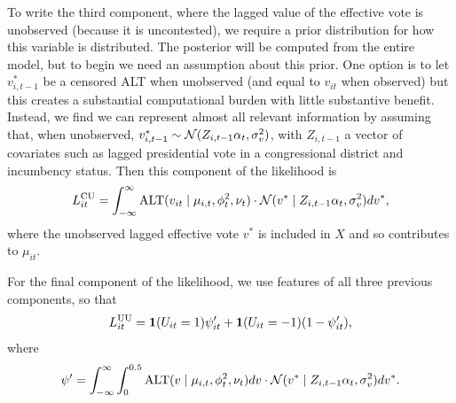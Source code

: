 \documentclass[12pt]{article}
\theoremstyle{definition}
\begin{document}
\begin{appendices}
To write the third component, where the lagged value of the effective vote is unobserved (because it is uncontested), we require a prior distribution for how this variable is distributed.  The posterior will be computed from the entire model, but to begin we need an assumption about this prior.  One option is to let $v_{i,t-1}^*$ be a censored ALT when unobserved (and equal to $v_{it}$ when observed) but this creates a substantial computational burden with little substantive benefit. Instead, we find we can represent almost all relevant information by assuming that, when unobserved, $v_{i,t-1}^*\sim{\cal N}(Z_{i,t-1}\alpha_t,\sigma_v^2)$, with $Z_{i,t-1}$ a vector of covariates such as lagged presidential vote in a congressional district and incumbency status.  Then this component of the likelihood is
\begin{equation}\label{CU}
  L_{it}^{\text{CU}} = \int_{-\infty}^\infty \text{ALT}(v_{it}\mid\mu_{i,t},\phi_t^2,\nu_t)
  \cdot {\cal N}(v^*\mid Z_{i,t-1}\alpha_t,\sigma_v^2) dv^*,
\end{equation}
where the unobserved lagged effective vote $v^*$ is included in $X$ and so contributes to $\mu_{it}$.

For the final component of the likelihood, we use features of all three previous components, so that
\begin{equation}\label{UU}
  L_{it}^{\text{UU}} = {\bf 1}(U_{it}=1)\psi^\prime_{it} + {\bf 1}(U_{it}=-1)(1-\psi^\prime_{it}),
\end{equation}
where
\begin{equation*}
  \psi^\prime = \int_{-\infty}^\infty\int_0^{0.5}\text{ALT}(v\mid\mu_{i,t},\phi_t^2,\nu_t)dv
  \cdot {\cal N}(v^*\mid Z_{i,t-1}\alpha_t,\sigma_v^2) dv^*.
\end{equation*}



\end{appendices}

\singlespace
\printbibliography
\end{document}
